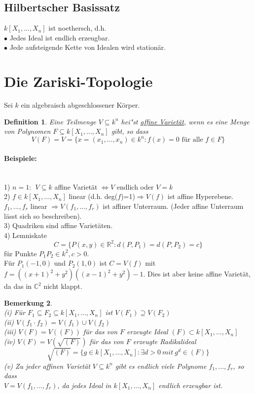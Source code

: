 \documentclass[a4paper,12pt]{report}
\theoremstyle{break}
\newtheorem{Def}{Definition}[chapter]
\newtheorem{Bem}[Def]{Bemerkung}
\theoremstyle{nonumberbreak}
\theoremstyle{nonumberplain}
\begin{document}
\subsection{Hilbertscher Basissatz}
$k[X_1,...,X_n]$ ist noethersch, d.h.\\
$\bullet$ Jedes Ideal ist endlich erzeugbar.\\
$\bullet$ Jede aufsteigende Kette von Idealen wird stationär.
\section{Die Zariski-Topologie}
Sei $k$ ein algebraisch abgeschlossener Körper.
\begin{Def}
Eine Teilmenge $V\subseteq k^n$ hei"st \underline{affine Varietät}, wenn es eine Menge von Polynomen $F \subseteq k[X_1,...,X_n]$ gibt, so dass 
$$V(F)=V= \{x= (x_1,...,x_n)\in k^n: f(x)=0 \textrm{~für~alle~} f \in F\}$$
\end{Def}
\paragraph{Beispiele:}~\\
1) $n=1:~~V\subseteq k$ affine Varietät $\Leftrightarrow V$ endlich oder $V=k$ \\
2) $f\in k[X_1,...,X_n]$ linear (d.h. deg($f$)=1)$\Rightarrow V(f)$ ist affine Hyperebene.\\
$f_1,...,f_r$ linear $\Rightarrow V(f_1,...,f_r)$ ist affiner Unterraum. (Jeder affine Unterraum lässt sich so beschreiben).\\
3) Quadriken sind affine Varietäten.\\
4) Lemniskate
$$C=\{P(x,y) \in \mathbb{R}^2: d(P,P_1)=d(P,P_2)=c\}$$
für Punkte $P_1P_2\in k^2, c>0$.\\
Für $P_1(-1,0)$ und $P_2(1,0)$ ist $C=V(f)$ mit $f=((x+1)^2+y^2)((x-1)^2+y^2)-1$.
Dies ist aber keine affine Varietät, da das in $\mathbb{C}^2$ nicht klappt.
\begin{Bem}~\\
(i) Für $F_1 \subseteq F_2 \subseteq k[X_1,...,X_n]$ ist $V(F_1)\supseteq V(F_2)$\\
(ii) $V(f_1\cdot f_2)= V(f_1)\cup V(f_2)$\\
(iii) $V(F)=V((F))$ für das von $F$ erzeugte Ideal $(F)\subset k[X_1,...,X_n]$\\
(iv) $V(F)=V(\sqrt{(F)})$ für das von $F$ erzeugte Radikalideal
$$\sqrt{(F)}=\{g\in k[X_1,...,X_n]: \exists d>0 ~ mit~ g^d \in (F) \}$$
(v) Zu jeder affinen Varietät $V\subseteq k^n$ gibt es endlich viele Polynome $f_1,...,f_r$, so dass \\ $V=V(f_1,...,f_r)$, da jedes Ideal in $k[X_1,...,X_n]$ endlich erzeugbar ist.
\end{Bem}
\end{document}
